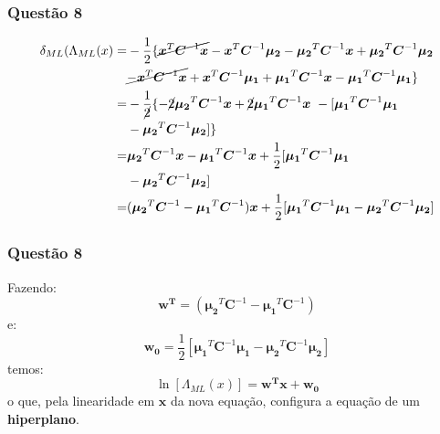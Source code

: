 \documentclass{beamer}\usepackage[]{graphicx}\usepackage[]{color}
\begin{document}
		\begin{frame}
			\frametitle{Questão 8}
			\begin{align*}
				\delta_{ML}(\Lambda_{ML}(x)= &-\frac{1}{2}\{ \cancel{\boldsymbol{x}^{T}\boldsymbol{C}^{-1}\boldsymbol{x}} - \boldsymbol{x}^{T}\boldsymbol{C}^{-1}\boldsymbol{\mu_{2}} - \boldsymbol{\mu_{2}}^{T}\boldsymbol{C}^{-1}\boldsymbol{x} + 
				\boldsymbol{\mu_{2}}^{T}\boldsymbol{C}^{-1}\boldsymbol{\mu_{2}}\\
				&\cancel{-\boldsymbol{x}^{T}\boldsymbol{C}^{-1}\boldsymbol{x}} + 
				\boldsymbol{x}^{T}\boldsymbol{C}^{-1}\boldsymbol{\mu_{1}} + 
				\boldsymbol{\mu_{1}}^{T}\boldsymbol{C}^{-1}\boldsymbol{x} - 
				\boldsymbol{\mu_{1}}^{T}\boldsymbol{C}^{-1}\boldsymbol{\mu_{1}}\}\\
				=&-\frac{1}{\cancel{2}}\{ -\cancel{2}\boldsymbol{\mu_{2}}^{T}\boldsymbol{C}^{-1}\boldsymbol{x}
				+ \cancel{2}\boldsymbol{\mu_{1}}^{T}\boldsymbol{C}^{-1}\boldsymbol{x}\ - 
			    [\boldsymbol{\mu_{1}}^{T}\boldsymbol{C}^{-1}\boldsymbol{\mu_{1}}\\ &- 
			    \boldsymbol{\mu_{2}}^{T}\boldsymbol{C}^{-1}\boldsymbol{\mu_{2}}]\}\\
			    =&\boldsymbol{\mu_{2}}^{T}\boldsymbol{C}^{-1}\boldsymbol{x} - \boldsymbol{\mu_{1}}^{T}\boldsymbol{C}^{-1}\boldsymbol{x} + \frac{1}{2}[\boldsymbol{\mu_{1}}^{T}\boldsymbol{C}^{-1}\boldsymbol{\mu_{1}}\\ &- 
			    \boldsymbol{\mu_{2}}^{T}\boldsymbol{C}^{-1}\boldsymbol{\mu_{2}}]\\
			    =&(\boldsymbol{\mu_{2}}^{T}\boldsymbol{C}^{-1} - \boldsymbol{\mu_{1}}^{T}\boldsymbol{C}^{-1})\boldsymbol{x}+\frac{1}{2}[\boldsymbol{\mu_{1}}^{T}\boldsymbol{C}^{-1}\boldsymbol{\mu_{1}} - \boldsymbol{\mu_{2}}^{T}\boldsymbol{C}^{-1}\boldsymbol{\mu_{2}}]
			\end{align*}
		\end{frame}
	
		\begin{frame}
			\frametitle{Questão 8}
			Fazendo: $$\boldsymbol{w^{T}} = (\boldsymbol{\mu_{2}}^{T}\boldsymbol{C}^{-1} - \boldsymbol{\mu_{1}}^{T}\boldsymbol{C}^{-1})$$ e: $$\boldsymbol{w_{0}} = \frac{1}{2}[\boldsymbol{\mu_{1}}^{T}\boldsymbol{C}^{-1}\boldsymbol{\mu_{1}} - \boldsymbol{\mu_{2}}^{T}\boldsymbol{C}^{-1}\boldsymbol{\mu_{2}}]$$ temos:
			$$\ln[\Lambda_{ML}(x)] = \boldsymbol{w^{T}}\boldsymbol{x} + \boldsymbol{w_{0}}$$
			o que, pela linearidade em $\boldsymbol{x}$ da nova equação, configura a equação de um \textbf{hiperplano}.
		\end{frame}
\end{document}
